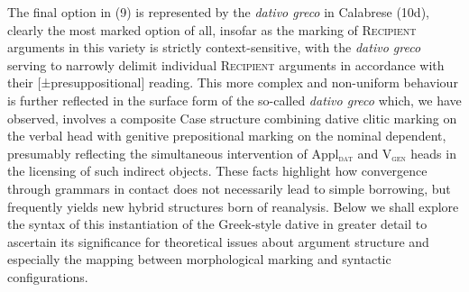 \documentclass[12pt]{article}
\newcommand\textsubscript[1]{\ensuremath{{}_{\text{#1}}}}
\newenvironment{styleStandard}{\setlength\leftskip{0cm}\setlength\rightskip{0cm plus 1fil}\setlength\parindent{0cm}\setlength\parfillskip{0pt plus 1fil}\setlength\parskip{0cm plus 1pt}\writerlistparindent\writerlistleftskip\leavevmode\normalfont\normalsize\writerlistlabel\ignorespaces}{\unskip\vspace{0cm plus 1pt}\par}
\newenvironment{styleTextbody}{\setlength\leftskip{0cm}\setlength\rightskip{0cm}\setlength\parindent{0cm}\setlength\parfillskip{0pt plus 1fil}\setlength\parskip{0cm plus 1pt}\writerlistparindent\writerlistleftskip\leavevmode\normalfont\normalsize\writerlistlabel\ignorespaces}{\unskip\vspace{0cm plus 1pt}\par}
\newcommand\writerlistleftskip{}
\newcommand\writerlistparindent{}
\newcommand\writerlistlabel{}
\begin{document}
\begin{styleStandard}
\end{styleStandard}

\begin{styleTextbody}
The final option in (9) is represented by the \textit{dativo greco }in Calabrese\textit{ }(10d), clearly the most marked option of all, insofar as the marking of \textsc{Recipient} arguments in this variety is strictly context-sensitive, with the \textit{dativo greco }serving to narrowly delimit individual \textsc{Recipient} arguments in accordance with their [±presuppositional] reading. This more complex and non-uniform behaviour is further reflected in the surface form of the so-called \textit{dativo greco} which, we have observed, involves a composite Case structure combining dative clitic marking on the verbal head with genitive prepositional marking on the nominal dependent, presumably reflecting the simultaneous intervention of Appl\textsc{\textsubscript{dat}} and V\textsc{\textsubscript{gen}} heads in the licensing of such indirect objects. These facts highlight how convergence through grammars in contact does not necessarily lead to simple borrowing, but frequently yields new hybrid structures born of reanalysis. Below we shall explore the syntax of this instantiation of the Greek-style dative in greater detail to ascertain its significance for theoretical issues about argument structure and especially the mapping between morphological marking and syntactic configurations.
\end{styleTextbody}
\end{document}
